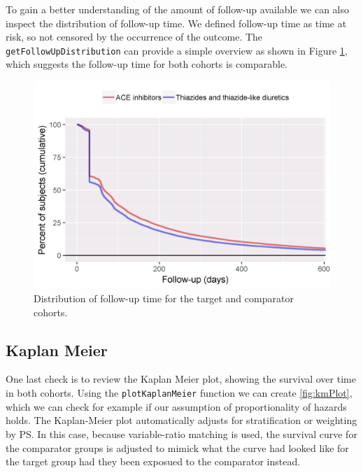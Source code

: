 \documentclass[11pt]{book}
\begin{document}
To gain a better understanding of the amount of follow-up available we
can also inspect the distribution of follow-up time. We defined
follow-up time as time at risk, so not censored by the occurrence of the
outcome. The \texttt{getFollowUpDistribution} can provide a simple
overview as shown in Figure \ref{fig:followUp}, which suggests the
follow-up time for both cohorts is comparable.

\begin{figure}

{\centering \includegraphics[width=0.8\linewidth]{images/PopulationLevelEstimation/followUp} 

}

\caption{Distribution of follow-up time for the target and comparator cohorts.}\label{fig:followUp}
\end{figure}

\subsection{Kaplan Meier}\label{kaplan-meier}

One last check is to review the Kaplan Meier plot, showing the survival
over time in both cohorts. Using the \texttt{plotKaplanMeier} function
we can create \ref{fig:kmPlot}, which we can check for example if our
assumption of proportionality of hazards holds. The Kaplan-Meier plot
automatically adjusts for stratification or weighting by PS. In this
case, because variable-ratio matching is used, the survival curve for
the comparator groups is adjusted to mimick what the curve had looked
like for the target group had they been exposued to the comparator
instead.
\end{document}
